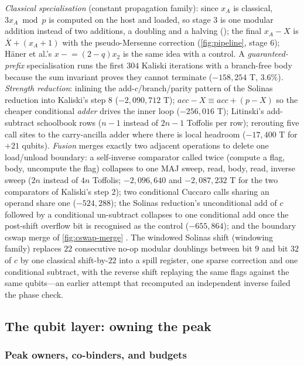 \emph{Classical specialisation} (constant propagation family): since $x_A$ is classical, $3x_A\bmod p$ is computed on the host and loaded, so stage 3 is one modular addition instead of two additions, a doubling and a halving (); the final $x_A-X$ is $\overline X+(x_A+1)$ with the pseudo-Mersenne correction (\cref{fig:pipeline}, stage 6); H\"aner et al.'s $x\mathrel{-}=(2-q)x_2$ is the same idea with a control. A \emph{guaranteed-prefix} specialisation runs the first $304$ Kaliski iterations with a branch-free body because the sum invariant proves they cannot terminate ($-158{,}254$ T, $3.6\%$). \emph{Strength reduction}: inlining the add-$c$/branch/parity pattern of the Solinas reduction into Kaliski's step 8 ($-2{,}090{,}712$ T); $acc-X\equiv acc+(p-X)$ so the cheaper conditional \emph{adder} drives the inner loop ($-256{,}016$ T); Litinski's add-subtract schoolbook rows ($n-1$ instead of $2n-1$ Toffolis per row); rerouting five call sites to the carry-ancilla adder where there is local headroom ($-17{,}400$ T for $+21$ qubits). \emph{Fusion} merges exactly two adjacent operations to delete one load/unload boundary: a self-inverse comparator called twice (compute a flag, body, uncompute the flag) collapses to one MAJ sweep, read, body, read, inverse sweep ($2n$ instead of $4n$ Toffolis; $-2{,}096{,}640$ and $-2{,}087{,}232$ T for the two comparators of Kaliski's step 2); two conditional Cuccaro calls sharing an operand share one  ($-524{,}288$); the Solinas reduction's unconditional add of $c$ followed by a conditional un-subtract collapses to one conditional add once the post-shift overflow bit is recognised as the control ($-655{,}864$); and the boundary cswap merge of \cref{fig:cswap-merge} \cite{ecdsafail26}. The windowed Solinas shift (windowing family) replaces $22$ consecutive no-op modular doublings between bit $9$ and bit $32$ of $c$ by one classical shift-by-$22$ into a spill register, one sparse correction and one conditional subtract, with the reverse shift replaying the same flags against the same qubits---an earlier attempt that recomputed an independent inverse failed the phase check.

\subsection{The qubit layer: owning the peak}\label{sec:qubits}

\subsubsection{Peak owners, co-binders, and budgets}\label{sec:peak}

